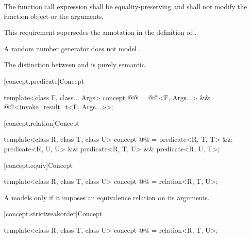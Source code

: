 \begin{itemdescr}
\pnum
The  function call expression shall be
equality-preserving and
shall not modify the function object or the arguments.
\begin{note}
This requirement supersedes the annotation in the definition of
.
\end{note}

\pnum
\begin{example}
A random number generator does not model .
\end{example}

\pnum
\begin{note}
The distinction between  and 
is purely semantic.
\end{note}
\end{itemdescr}

[concept.predicate]{Concept }

\begin{itemdecl}
template<class F, class... Args>
  concept @@ =
    @@<F, Args...> && @@<invoke_result_t<F, Args...>>;
\end{itemdecl}

[concept.relation]{Concept }

\begin{itemdecl}
template<class R, class T, class U>
  concept @@ =
    predicate<R, T, T> && predicate<R, U, U> &&
    predicate<R, T, U> && predicate<R, U, T>;
\end{itemdecl}

[concept.equiv]{Concept }

\begin{itemdecl}
template<class R, class T, class U>
  concept @@ = relation<R, T, U>;
\end{itemdecl}

\begin{itemdescr}
\pnum
A  models  only if
it imposes an equivalence relation on its arguments.
\end{itemdescr}

[concept.strictweakorder]{Concept }

\begin{itemdecl}
template<class R, class T, class U>
  concept @@ = relation<R, T, U>;
\end{itemdecl}

